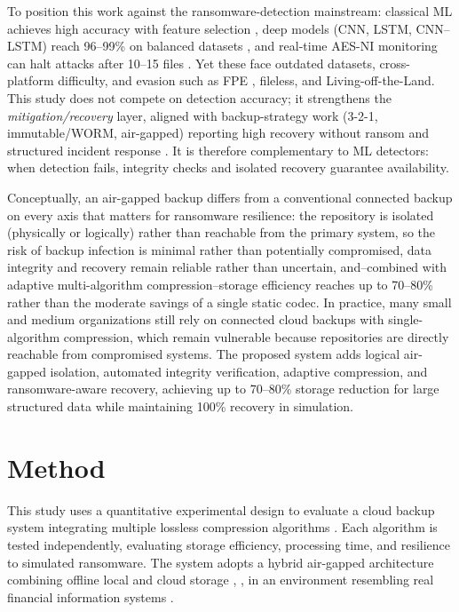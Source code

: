 \documentclass{iaesarticle}
\begin{document}
To position this work against the ransomware-detection mainstream: classical ML achieves high accuracy with feature selection \cite{31}, deep models (CNN, LSTM, CNN--LSTM) reach 96--99\% on balanced datasets \cite{30}, and real-time AES-NI monitoring can halt attacks after 10--15 files \cite{32}. Yet these face outdated datasets, cross-platform difficulty, and evasion such as FPE \cite{43}, fileless, and Living-off-the-Land. This study does not compete on detection accuracy; it strengthens the \textit{mitigation/recovery} layer, aligned with backup-strategy work (3-2-1, immutable/WORM, air-gapped) reporting high recovery without ransom \cite{44} and structured incident response \cite{45}. It is therefore complementary to ML detectors: when detection fails, integrity checks and isolated recovery guarantee availability.

Conceptually, an air-gapped backup differs from a conventional connected backup on every axis that matters for ransomware resilience: the repository is isolated (physically or logically) rather than reachable from the primary system, so the risk of backup infection is minimal rather than potentially compromised, data integrity and recovery remain reliable rather than uncertain, and--combined with adaptive multi-algorithm compression--storage efficiency reaches up to 70--80\% rather than the moderate savings of a single static codec. In practice, many small and medium organizations still rely on connected cloud backups with single-algorithm compression, which remain vulnerable because repositories are directly reachable from compromised systems. The proposed system adds logical air-gapped isolation, automated integrity verification, adaptive compression, and ransomware-aware recovery, achieving up to 70--80\% storage reduction for large structured data while maintaining 100\% recovery in simulation.

\section{Method}
\label{sec:method}
This study uses a quantitative experimental design to evaluate a cloud backup system integrating multiple lossless compression algorithms \cite{22}. Each algorithm is tested independently, evaluating storage efficiency, processing time, and resilience to simulated ransomware. The system adopts a hybrid air-gapped architecture combining offline local and cloud storage \cite{21}, \cite{27}, in an environment resembling real financial information systems \cite{29}.
\end{document}
